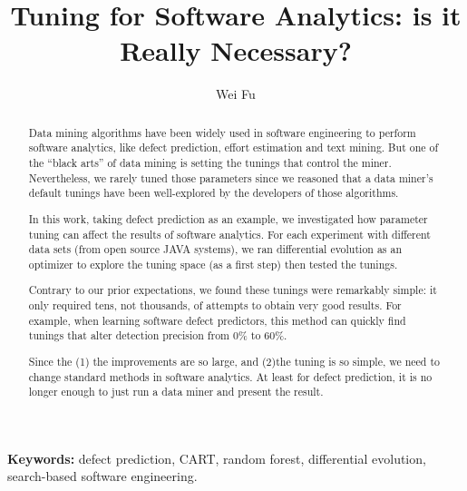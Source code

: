\documentclass[conference]{IEEEtran}
\begin{document}
\title{ Tuning for Software Analytics: is it Really Necessary?}
\author{Wei Fu }
\maketitle
\thispagestyle{plain}
\pagestyle{plain}

\begin{abstract}
Data mining algorithms have been widely used in software engineering to perform software 
analytics, like defect
prediction, effort estimation and text mining. But one of the “black arts” of data mining is setting
the tunings that control the miner. Nevertheless, we rarely tuned those parameters since we
reasoned that a data miner’s default tunings have been well-explored by the developers of
those algorithms.

In this work, taking defect prediction as an example, we investigated how parameter tuning can
affect the results of software analytics. For each experiment with different data sets (from open
source JAVA systems), we ran differential evolution as an optimizer to explore the tuning space
(as a first step) then tested the tunings.

Contrary to our prior expectations, we found these tunings were remarkably simple: it only
required tens, not thousands, of attempts to obtain very good results. For example, when
learning software defect predictors, this method can quickly find tunings that alter detection
precision from 0\% to 60\%.

Since the (1) the improvements are so large, and (2)the tuning is so simple, we need to change
standard methods in software analytics. At least for defect prediction, it is no longer enough to
just run a data miner and present the result.

\end{abstract}

\vspace{1mm}
\noindent
{\bf Keywords:} defect prediction, CART, random forest,
differential evolution,
search-based software engineering.
{} %






\end{document}
